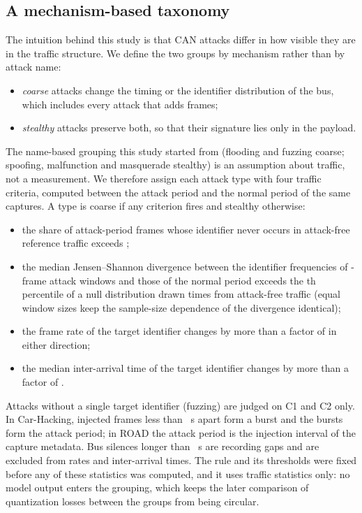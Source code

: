 \subsection{A mechanism-based taxonomy}
The intuition behind this study is that CAN attacks differ in how visible they are in the traffic structure. We
define the two groups by mechanism rather than by attack name:
\begin{itemize}
\item \emph{coarse} attacks change the timing or the identifier distribution of the bus, which includes every
attack that adds frames;
\item \emph{stealthy} attacks preserve both, so that their signature lies only in the payload.
\end{itemize}
The name-based grouping this study started from (flooding and fuzzing coarse; spoofing, malfunction and masquerade
stealthy) is an assumption about traffic, not a measurement. We therefore assign each attack type with four traffic
criteria, computed between the attack period and the normal period of the same captures. A type is coarse if any
criterion fires and stealthy otherwise:
\begin{itemize}
\item[C1] the share of attack-period frames whose identifier never occurs in attack-free reference traffic
exceeds \COneThr;
\item[C2] the median Jensen--Shannon divergence between the identifier frequencies of \CTwoFrames-frame attack
windows and those of the normal period exceeds the \CTwoPct{}th percentile of a null distribution drawn
\CTwoDraws{} times from attack-free traffic (equal window sizes keep the sample-size dependence of the divergence
identical);
\item[C3] the frame rate of the target identifier changes by more than a factor of \CBand{} in either direction;
\item[C4] the median inter-arrival time of the target identifier changes by more than a factor of \CBand{}.
\end{itemize}
Attacks without a single target identifier (fuzzing) are judged on C1 and C2 only. In Car-Hacking, injected frames
less than \BurstGapS{}~s apart form a burst and the bursts form the attack period; in ROAD the attack period is the
injection interval of the capture metadata. Bus silences longer than \RecGapS{}~s are recording gaps and are
excluded from rates and inter-arrival times. The rule and its thresholds were fixed before any of these statistics
was computed, and it uses traffic statistics only: no model output enters the grouping, which keeps the later
comparison of quantization losses between the groups from being circular.

